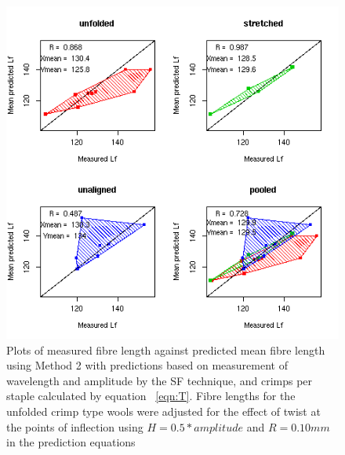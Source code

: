 %

\begin{figure}[!h]
  \centering
  \includegraphics[width=1.1\textwidth]{figsfpredlf.png}
  \caption{Plots of measured fibre length against predicted mean fibre length using Method 2 with predictions based on measurement of wavelength and amplitude by the SF technique, and crimps per staple calculated by equation ~\ref{eqn:T}. Fibre lengths for the unfolded crimp type wools were adjusted for the effect of twist at the points of inflection using $H = 0.5 * amplitude$ and $R = 0.10 mm$ in the prediction equations }
  \label{fig:sfpredlf}
\end{figure}

%

